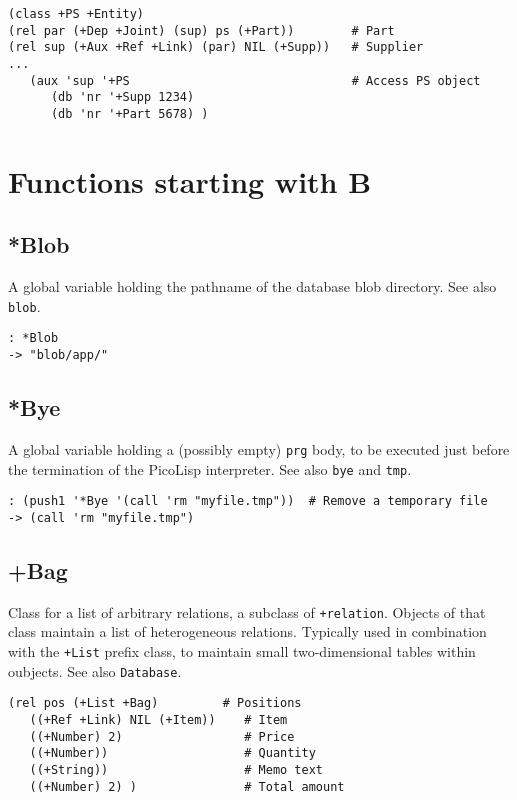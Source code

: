 {\begin{verbatim}
(class +PS +Entity)
(rel par (+Dep +Joint) (sup) ps (+Part))        # Part
(rel sup (+Aux +Ref +Link) (par) NIL (+Supp))   # Supplier
...
   (aux 'sup '+PS                               # Access PS object
      (db 'nr '+Supp 1234)
      (db 'nr '+Part 5678) )
\end{verbatim}


\chapter{Functions starting with B}
\label{sec-8-1-2}


 
\section{*Blob}
\label{sec-8-1-2-1}


A global variable holding the pathname of the database blob directory.
See also \texttt{blob}.


\begin{verbatim}
: *Blob
-> "blob/app/"
\end{verbatim}

 
\section{*Bye}
\label{sec-8-1-2-2}


A global variable holding a (possibly empty) \texttt{prg} body, to be executed
just before the termination of the PicoLisp interpreter. See also \texttt{bye}
and \texttt{tmp}.


\begin{verbatim}
: (push1 '*Bye '(call 'rm "myfile.tmp"))  # Remove a temporary file
-> (call 'rm "myfile.tmp")
\end{verbatim}

 
\section{+Bag}
\label{sec-8-1-2-3}


Class for a list of arbitrary relations, a subclass of \texttt{+relation}.
Objects of that class maintain a list of heterogeneous relations.
Typically used in combination with the \texttt{+List} prefix class, to maintain
small two-dimensional tables within oubjects. See also \texttt{Database}.


\begin{verbatim}
(rel pos (+List +Bag)         # Positions
   ((+Ref +Link) NIL (+Item))    # Item
   ((+Number) 2)                 # Price
   ((+Number))                   # Quantity
   ((+String))                   # Memo text
   ((+Number) 2) )               # Total amount
\end{verbatim}

}
